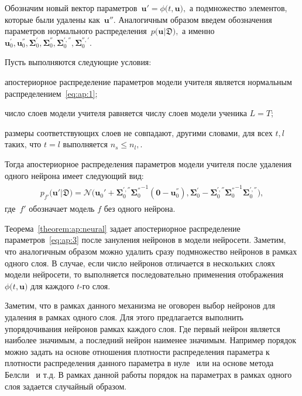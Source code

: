 \documentclass[12pt]{a&t}
\begin{document}
Обозначим новый вектор параметров~$\mathbf{u}' =  \phi\bigr(t, \mathbf{u}\bigr),$ а подмножество элементов, которые были удалены как~$\mathbf{u}''.$ Аналогичным образом введем обозначения параметров нормального распределения~$p\bigr(\mathbf{u}|\mathfrak{D}\bigr),$ а именно $\mathbf{u}_0^{'}, \mathbf{u}_0^{''}, \bm{\Sigma}_0^{'}, \bm{\Sigma}_0^{''}, \bm{\Sigma}_0^{', ''}, \bm{\Sigma}_0^{'','}.$

\begin{theorem}
\label{theorem:ap:neural}
Пусть выполняются следующие условия:
\begin{enumlist}
\item апостериорное распределение параметров модели учителя является нормальным распределением~\eqref{eq:ap:1};
\item число слоев модели учителя равняется числу слоев модели ученика $L=T$;
\item размеры соответствующих слоев не совпадают, другими словами, для всех $t, l$ таких, что $t=l$ выполняется $n_s \leq n_l,$.
\end{enumlist}
Тогда апостериорное распределения параметров модели учителя после удаления одного нейрона имеет следующий вид:
\begin{gather}
\label{eq:ap:3}
\begin{aligned}
p_{f'}\bigr(\mathbf{u}'|\mathfrak{D}\bigr) = \mathcal{N}\bigr(\mathbf{u}_{0}'+\bm{\Sigma}_0^{', ''}{\bm{\Sigma}_0^{''}}^{-1}\left(\mathbf{0} - \mathbf{u}_0^{''}\right), \bm{\Sigma}_0^{'}-\bm{\Sigma}_0^{', ''}{\bm{\Sigma}_0^{''}}^{-1}\bm{\Sigma}_0^{', ''}\bigr),
\end{aligned}
\end{gather}
где~$f'$ обозначает модель $f$ без одного нейрона.
\end{theorem}

Теорема~\ref{theorem:ap:neural} задает апостериорное распределение параметров~\eqref{eq:ap:3} после зануления нейронов в модели нейросети. Заметим, что аналогичным образом можно удалить сразу подмножество нейронов в рамках одного слоя. В случае, если число нейронов отличается в нескольких слоях модели нейросети, то выполняется последовательно применения отображения~$\phi\bigr(t, \mathbf{u}\bigr)$ для каждого $t$-го слоя.

Заметим, что в рамках данного механизма не оговорен выбор нейронов для удаления в рамках одного слоя. Для этого предлагается выполнить упорядочивания нейронов рамках каждого слоя. Где первый нейрон является наиболее значимым, а последний нейрон наименее значимым. Например порядок можно задать на основе отношения плотности распределения параметра к плотности распределения данного параметра в нуле~\cite{graves2011} или на основе метода Белсли~\cite{grabovoy2019} и т.д. В рамках данной работы порядок на параметрах в рамках одного слоя задается случайный образом.
\end{document}
